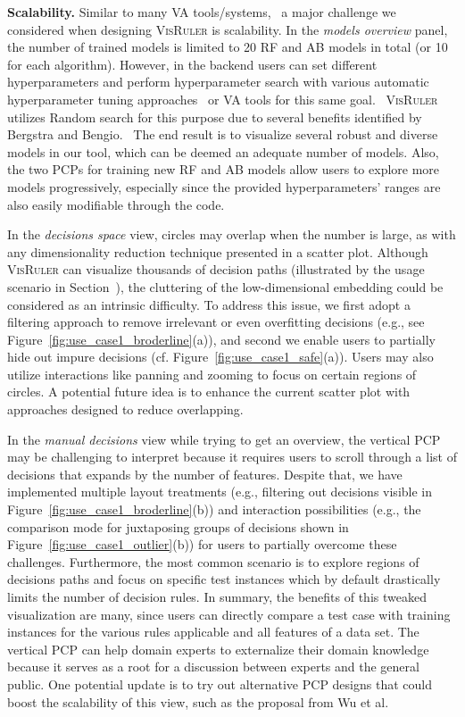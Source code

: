 \textbf{Scalability.} Similar to many VA tools/systems,~\cite{Robertson2009Scale} a major challenge we considered when designing \textsc{VisRuler} is scalability.
%
In the \emph{models overview} panel, the number of trained models is limited to 20 RF and AB models in total (or 10 for each algorithm). However, in the backend users can set different hyperparameters and perform hyperparameter search with various automatic hyperparameter tuning approaches~\cite{Claesen2015Hyperparameter,Claesen2014Easy} or VA tools for this same goal.~\cite{Li2018HyperTuner,Chatzimparmpas2021VisEvol} \textsc{VisRuler} utilizes Random search for this purpose due to several benefits identified by Bergstra and Bengio.~\cite{Bergstra2012Random} The end result is to visualize several robust and diverse models in our tool, which can be deemed an adequate number of models. Also, the two PCPs for training new RF and AB models allow users to explore more models progressively, especially since the provided hyperparameters' ranges are also easily modifiable through the code.

In the \emph{decisions space} view, circles may overlap when the number is large, as with any dimensionality reduction technique presented in a scatter plot. Although \textsc{VisRuler} can visualize thousands of decision paths (illustrated by the usage scenario in Section~), the cluttering of the low-dimensional embedding could be considered as an intrinsic difficulty. To address this issue, we first adopt a filtering approach to remove irrelevant or even overfitting decisions (e.g., see Figure~\ref{fig:use_case1_broderline}(a)), and second we enable users to partially hide out impure decisions (cf. Figure~\ref{fig:use_case1_safe}(a)). Users may also utilize interactions like panning and zooming to focus on certain regions of circles. A potential future idea is to enhance the current scatter plot with approaches designed to reduce overlapping.~\cite{Mayorga2013Splatterplots,Hilasaca2019Overlap}

In the \emph{manual decisions} view while trying to get an overview, the vertical PCP may be challenging to interpret because it requires users to scroll through a list of decisions that expands by the number of features. Despite that, we have implemented multiple layout treatments (e.g., filtering out decisions visible in Figure~\ref{fig:use_case1_broderline}(b)) and interaction possibilities (e.g., the comparison mode for juxtaposing groups of decisions shown in Figure~\ref{fig:use_case1_outlier}(b)) for users to partially overcome these challenges. Furthermore, the most common scenario is to explore regions of decisions paths and focus on specific test instances which by default drastically limits the number of decision rules. In summary, the benefits of this tweaked visualization are many, since users can directly compare a test case with training instances for the various rules applicable and all features of a data set. The vertical PCP can help domain experts to externalize their domain knowledge because it serves as a root for a discussion between experts and the general public. One potential update is to try out alternative PCP designs that could boost the scalability of this view, such as the proposal from Wu et al.~\cite{Wu2017Making}

